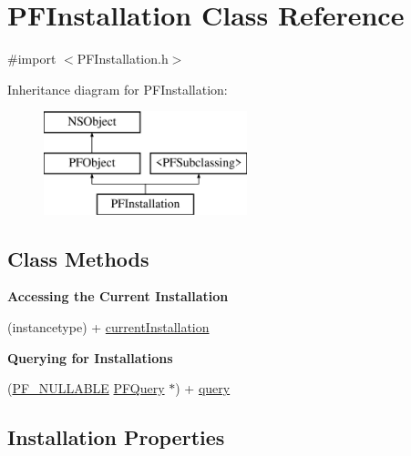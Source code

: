 \hypertarget{interface_p_f_installation}{}\section{P\+F\+Installation Class Reference}
\label{interface_p_f_installation}


{\ttfamily \#import $<$P\+F\+Installation.\+h$>$}

Inheritance diagram for P\+F\+Installation\+:\begin{figure}[H]
\begin{center}
\leavevmode
\includegraphics[height=3.000000cm]{interface_p_f_installation}
\end{center}
\end{figure}
\subsection*{Class Methods}
\begin{Indent}{\bf Accessing the Current Installation}\par
{\em 

 

 }\begin{DoxyCompactItemize}
\item 
(instancetype) + \hyperlink{interface_p_f_installation_aa1cf48319056fc6c291b3c07d25ecba2}{current\+Installation}
\end{DoxyCompactItemize}
\end{Indent}
\begin{Indent}{\bf Querying for Installations}\par
{\em 

 

 }\begin{DoxyCompactItemize}
\item 
(\hyperlink{_p_f_nullability_8h_a528d97a96c5fb279a45c378f5657fca2}{P\+F\+\_\+\+N\+U\+L\+L\+A\+B\+L\+E} \hyperlink{interface_p_f_query}{P\+F\+Query} $\ast$) + \hyperlink{interface_p_f_installation_a6746d978e58db0413ed4be993810de32}{query}
\end{DoxyCompactItemize}
\end{Indent}
\subsection*{Installation Properties}
\label{_amgrpd81e944601ec4b064ae1c965f218c92b}%


